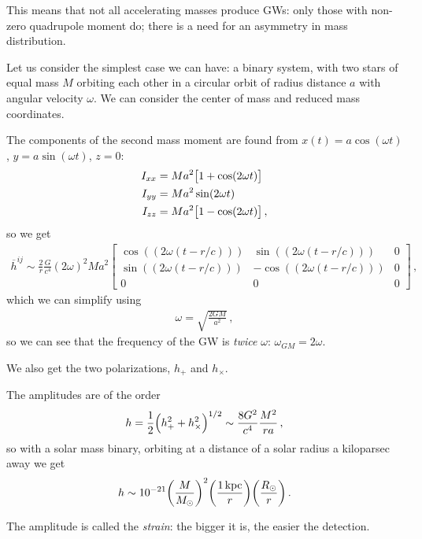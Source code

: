 \documentclass[main.tex]{subfiles}
\begin{document}
This means that not all accelerating masses produce GWs: only those with non-zero quadrupole moment do; there is a need for an asymmetry in mass distribution.

Let us consider the simplest case we can have: a binary system, with two stars of equal mass \(M\) orbiting each other in a circular orbit of radius distance \(a\) with angular velocity \(\omega \). We can consider the center of mass and reduced mass coordinates. 

The components of the second mass moment are found from \(x(t) = a \cos(\omega t)\), \(y = a \sin( \omega t)\), \(z = 0\): 
%
\begin{align}
I_{xx} &= Ma^2 \qty[1 + \cos(2 \omega t)] \\
I_{yy} &= Ma^2 \sin(2 \omega t) \\
I_{zz} &= Ma^2 \qty[1 - \cos(2 \omega t)] 
\,,
\end{align}
%
so we get 
%
\begin{align}
\overline{h}^{ij} \sim \frac{2}{r} \frac{G}{c^{4}} (2 \omega )^2  M a^2
\left[\begin{array}{ccc}
\cos((2 \omega (t - r/c))) & \sin((2 \omega (t - r/c))) & 0 \\ 
\sin((2 \omega (t - r/c))) & -\cos((2 \omega (t - r/c))) & 0 \\ 
0 & 0 & 0
\end{array}\right]
\,,
\end{align}
%
which we can simplify using 
%
\begin{align}
\omega = \sqrt{\frac{2GM}{a^2}}
\,,
\end{align}
%
so we can see that the frequency of the GW is \emph{twice} \(\omega \): \(\omega_{GM} = 2 \omega  \). 

We also get the two polarizations, \(h_{+}\) and \(h_{ \times }\).

The amplitudes are of the order 
%
\begin{align}
h = \frac{1}{2} \qty(h_{+}^2 + h_{ \times }^2)^{1/2} \sim \frac{8 G^2}{c^{4}} \frac{M^2}{ra}
\,,
\end{align}
%
so with a solar mass binary, orbiting at a distance of a solar radius a kiloparsec away we get 
%
\begin{align}
h \sim \num{e-21} \qty(\frac{M}{M_{\odot}})^2 \qty(\frac{\SI{1}{kpc}}{r}) \qty(\frac{R_{\odot}}{r})
\,.
\end{align}

The amplitude is called the \emph{strain}: the bigger it is, the easier the detection. 
\end{document}
